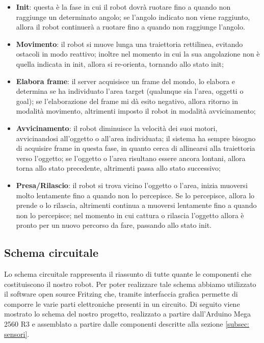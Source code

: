 \documentclass[a4paper,12pt,italian]{article}
\begin{document}
\begin{itemize}
	\item \textbf{Init}: questa è la fase in cui il robot dovrà ruotare fino a quando non raggiunge un determinato angolo; se l'angolo indicato non viene raggiunto, allora il robot continuerà a ruotare fino a quando non raggiunge l'angolo.
	\item \textbf{Movimento}: il robot si muove lunga una traiettoria rettilinea, evitando ostacoli in modo reattivo; inoltre nel momento in cui la sua angolazione non è quella indicata in init, allora si re-orienta, tornando allo stato init;
	\item \textbf{Elabora frame}: il server acquisisce un frame del mondo, lo elabora e determina se ha individuato l'area target (qualunque sia l'area, oggetti o goal); se l'elaborazione del frame mi dà esito negativo, allora ritorno in modalità movimento, altrimenti imposto il robot in modalità avvicinamento;
	\item \textbf{Avvicinamento}: il robot diminuisce la velocità dei suoi motori, avvicinandosi all'oggetto o all'area individuata; il sistema ha sempre bisogno di acquisire frame in questa fase, in quanto cerca di allinearsi alla traiettoria verso l'oggetto; se l'oggetto o l'area risultano essere ancora lontani, allora torna allo stato precedente, altrimenti passa allo stato successivo;
	\item \textbf{Presa/Rilascio}: il robot si trova vicino l'oggetto o l'area, inizia muoversi molto lentamente fino a quando non lo percepisce. Se lo percepisce, allora lo prende o lo rilascia, altrimenti continua a muoversi lentamente fino a quando non lo percepisce; nel momento in cui cattura o rilascia l'oggetto allora è pronto per un nuovo percorso da fare, passando allo stato init.
\end{itemize}

\subsection{Schema circuitale}
Lo schema circuitale rappresenta il riassunto di tutte quante le componenti che costituiscono il nostro robot. Per poter realizzare tale schema abbiamo utilizzato il software open source Fritzing che, tramite interfaccia grafica permette di comporre le varie parti elettroniche presenti in un circuito. Di seguito viene mostrato lo schema del nostro progetto, realizzato a partire dall’Arduino Mega 2560 R3 e assemblato a partire dalle componenti descritte alla sezione \ref{subsec: sensori}.
\end{document}
